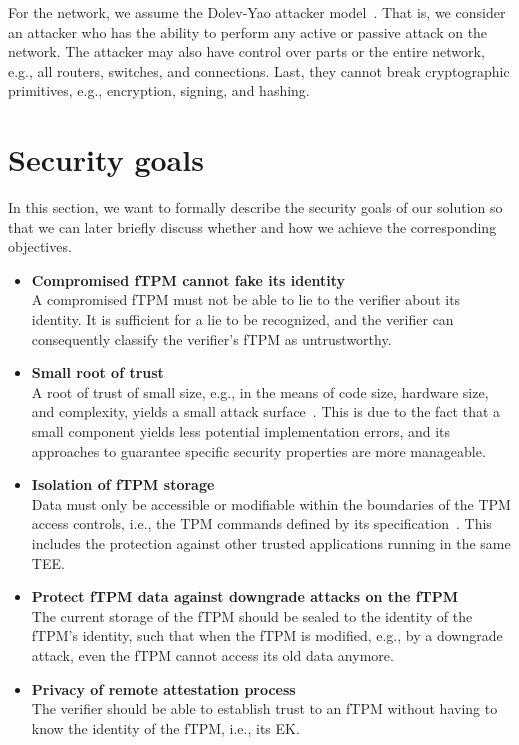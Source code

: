 For the network, we assume the Dolev-Yao attacker model~\cite{Dolev1983}.
That is, we consider an attacker who has the ability to perform any active or passive attack on the network.
The attacker may also have control over parts or the entire network, e.g., all routers, switches, and connections.
Last, they cannot break cryptographic primitives, e.g., encryption, signing, and hashing.

\section{Security goals}

In this section, we want to formally describe the security goals of our solution so that we can later briefly discuss whether and how we achieve the corresponding objectives.

\begin{itemize}
  \item{\textbf{Compromised fTPM cannot fake its identity}\\
  A compromised fTPM must not be able to lie to the verifier about its identity.
  It is sufficient for a lie to be recognized, and the verifier can consequently classify the verifier's fTPM as untrustworthy.}

  \item{\textbf{Small root of trust}\\
  A root of trust of small size, e.g., in the means of code size, hardware size, and complexity, yields a small attack surface~\cite{Singaravelu2006}.
  This is due to the fact that a small component yields less potential implementation errors, and its approaches to guarantee specific security properties are more manageable.}
  
  \item{\textbf{Isolation of fTPM storage}\\
  Data must only be accessible or modifiable within the boundaries of the TPM access controls, i.e., the TPM commands defined by its specification~\cite{tpm20}.}
  This includes the protection against other trusted applications running in the same TEE\@.
  
  \item{\textbf{Protect fTPM data against downgrade attacks on the fTPM}\\
  The current storage of the fTPM should be sealed to the identity of the fTPM's identity, such that when the fTPM is modified, e.g., by a downgrade attack, even the fTPM cannot access its old data anymore.}

  \item{\textbf{Privacy of remote attestation process}\\
  The verifier should be able to establish trust to an fTPM without having to know the identity of the fTPM, i.e., its EK\@.}
\end{itemize}

